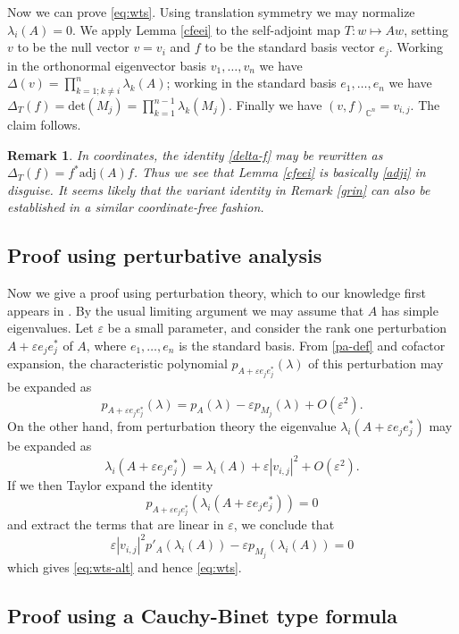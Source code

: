 \documentclass{amsart}
\newcommand\C{\mathbb{C}}
\newcommand\eps{\varepsilon}
\newtheorem{remark}[lemma]{Remark}
\begin{document}
Now we can prove \eqref{eq:wts}.  Using translation symmetry we may normalize $\lambda_i(A)=0$.  We apply Lemma \ref{cfeei} to the self-adjoint map $T: w \mapsto Aw$, setting $v$ to be the null vector $v = v_i$ and $f$ to be the standard basis vector $e_j$.  Working in the orthonormal eigenvector basis $v_1,\dots,v_n$ we have $\Delta(v) = \prod_{k=1; k \neq i}^n \lambda_k(A)$; working in the standard basis $e_1,\dots,e_n$ we have $\Delta_T(f) = \mathrm{det}( M_j ) = \prod_{k=1}^{n-1} \lambda_k(M_j)$.  Finally we have $(v,f)_{\C^n} = v_{i,j}$.  The claim follows.

\begin{remark} In coordinates, the identity \eqref{delta-f} may be rewritten as $\Delta_T(f) = f^* \mathrm{adj}(A) f$.  Thus we see that Lemma \ref{cfeei} is basically \eqref{adji} in disguise.  It seems likely that the variant identity in Remark \ref{grin} can also be established in a similar coordinate-free fashion.
\end{remark}


\subsection{Proof using perturbative analysis}\label{perturbative-sec}

Now we give a proof using perturbation theory, which to our knowledge first appears in \cite{Mukherjee1989}.  By the usual limiting argument we may assume that $A$ has simple eigenvalues.  Let $\eps$ be a small parameter, and consider the rank one perturbation $A + \eps e_j e_j^*$ of $A$, where $e_1,\dots,e_n$ is the standard basis.  From \eqref{pa-def} and cofactor expansion, the characteristic polynomial $p_{A+\eps e_j e_j^*}(\lambda)$ of this perturbation may be expanded as
$$ p_{A+\eps e_j e_j^*}(\lambda) = p_A(\lambda) - \eps p_{M_j}(\lambda) + O(\eps^2).$$
On the other hand, from perturbation theory the eigenvalue $\lambda_i( A+\eps e_j e_j^* )$ may be expanded as
$$ \lambda_i( A+\eps e_j e_j^* ) = \lambda_i(A) + \eps |v_{i,j}|^2 + O(\eps^2).$$
If we then Taylor expand the identity
$$ p_{A + \eps e_j e_j^*}( \lambda_i( A+\eps e_j e_j^* ) ) = 0$$
and extract the terms that are linear in $\eps$, we conclude that
$$ \eps |v_{i,j}|^2 p'_A(\lambda_i(A)) - \eps p_{M_j}(\lambda_i(A)) = 0$$
which gives \eqref{eq:wts-alt} and hence \eqref{eq:wts}.


\subsection{Proof using a Cauchy-Binet type formula}\label{cauchy-binet-sec}
\end{document}
